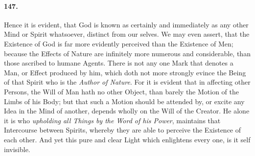 \documentclass[]{article}
\newenvironment{sectionbody}{}{}
\begin{document}
\begin{sectionbody}
\paragraph{147.} Hence it is evident, that {\sc God} is known as certainly and
immediately as any other Mind or Spirit whatsoever, distinct from
our selves.  We may even assert, that the Existence of {\sc God}
is far more evidently perceived than the Existence of Men;
because the Effects of Nature are infinitely more numerous and
considerable, than those ascribed to humane Agents.  There is not
any one Mark that denotes a Man, or Effect produced by him, which
doth not more strongly evince the Being of that Spirit who is the
\emph{Author of Nature}.  For it is evident that in affecting
other Persons, the Will of Man hath no other Object, than barely
the Motion of the Limbs of his Body; but that such a Motion
should be attended by, or excite any Idea in the Mind of another,
depends wholly on the Will of the {\sc Creator}.  He alone it is
who \emph{upholding all Things by the Word of his Power},
maintains that Intercourse between Spirits, whereby they are able
to perceive the Existence of each other.  And yet this pure and
clear Light which enlightens every one, is it self invisible.




\end{sectionbody}
\end{document}
